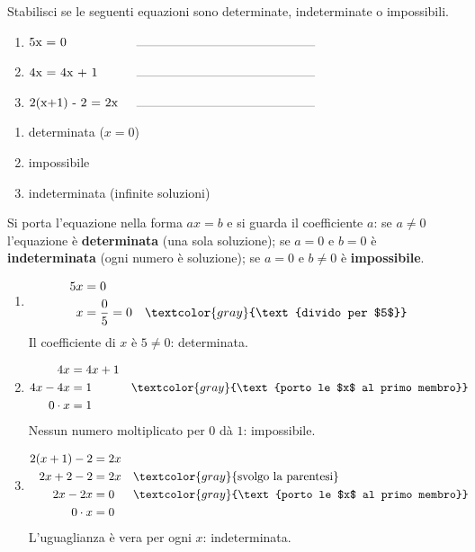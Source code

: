
\begin{question}[ID=1.1, subtitle={Classificazione di equazioni}, difficulty=facile, tags={equazioni}]
Stabilisci se le seguenti equazioni sono determinate, indeterminate o impossibili.
\begin{enumerate}[leftmargin=3cm]
    \item $\makebox[3cm][l]{5x = 0}\rule{5cm}{0.2pt}$
    \item $\makebox[3cm][l]{4x = 4x + 1}\rule{5cm}{0.2pt}$
    \item $\makebox[3cm][l]{2(x+1) - 2 = 2x}\rule{5cm}{0.2pt}$
\end{enumerate}
\begin{solution}
\begin{enumerate}
    \item determinata ($x=0$)
    \item impossibile
    \item indeterminata (infinite soluzioni)
\end{enumerate}
\end{solution}
\begin{explanation}
Si porta l'equazione nella forma $ax=b$ e si guarda il coefficiente $a$:
se $a\neq 0$ l'equazione è \textbf{determinata} (una sola soluzione); se $a=0$ e $b=0$ è \textbf{indeterminata} (ogni numero è soluzione); se $a=0$ e $b\neq 0$ è \textbf{impossibile}.
\begin{enumerate}
    \item \[\begin{aligned}
    5x &= 0\\
    x &= \dfrac{0}{5}=0 && \textcolor{gray}{\text{divido per $5$}}
    \end{aligned}\]
    Il coefficiente di $x$ è $5\neq0$: determinata.
    \item \[\begin{aligned}
    4x &= 4x+1\\
    4x-4x &= 1 && \textcolor{gray}{\text{porto le $x$ al primo membro}}\\
    0\cdot x &= 1
    \end{aligned}\]
    Nessun numero moltiplicato per $0$ dà $1$: impossibile.
    \item \[\begin{aligned}
    2(x+1)-2 &= 2x\\
    2x+2-2 &= 2x && \textcolor{gray}{\text{svolgo la parentesi}}\\
    2x-2x &= 0 && \textcolor{gray}{\text{porto le $x$ al primo membro}}\\
    0\cdot x &= 0
    \end{aligned}\]
    L'uguaglianza è vera per ogni $x$: indeterminata.
\end{enumerate}
\end{explanation}
\end{question}

